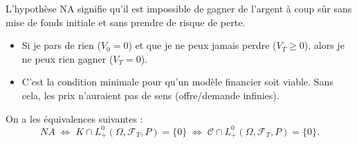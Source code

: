 \begin{tcolorbox}[title=Intuition : Pas d'argent magique (No Free Lunch), colback=red!5!white, colframe=red!50!black]
L'hypothèse NA signifie qu'il est impossible de gagner de l'argent à coup sûr sans mise de fonds initiale et sans prendre de risque de perte.
\begin{itemize}
    \item Si je pars de rien ($V_0=0$) et que je ne peux jamais perdre ($V_T \ge 0$), alors je ne peux rien gagner ($V_T=0$).
    \item C'est la condition minimale pour qu'un modèle financier soit viable. Sans cela, les prix n'auraient pas de sens (offre/demande infinies).
\end{itemize}
\end{tcolorbox}

\begin{lemme}
On a les équivalences suivantes :
\begin{equation}
NA \;\Longleftrightarrow\; K \cap L_+^0(\Omega, \mathcal{F}_T, P) = \{0\}
\;\Longleftrightarrow\;
\mathcal{C} \cap L_+^0(\Omega, \mathcal{F}_T, P) = \{0\}.
\end{equation}
\end{lemme}


